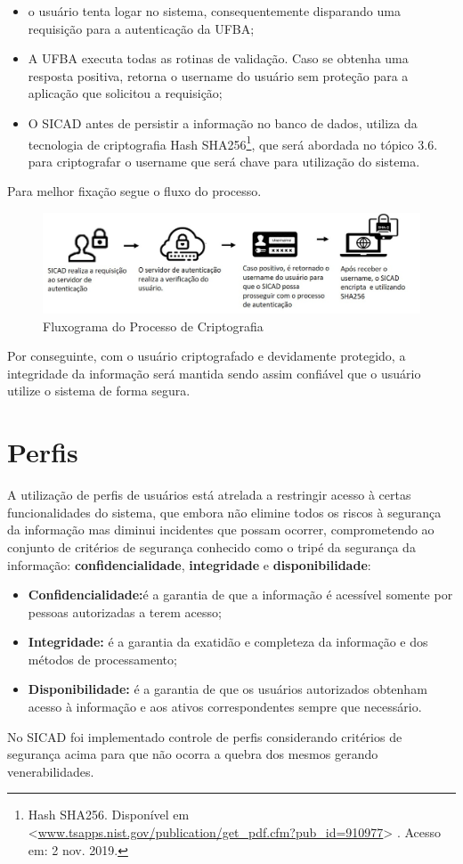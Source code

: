 \documentclass[12pt, a4paper]{report}
\begin{document}
\begin{itemize}
\item o usuário tenta logar no sistema, consequentemente disparando uma requisição para a autenticação da UFBA;
\item A UFBA executa todas as rotinas de validação.
Caso se obtenha uma resposta positiva, retorna o username do usuário sem proteção para a aplicação que solicitou a requisição;
\item O SICAD antes de persistir a informação no banco de dados, utiliza da tecnologia de criptografia Hash SHA256\footnote{Hash SHA256. Disponível em <\url{www.tsapps.nist.gov/publication/get_pdf.cfm?pub_id=910977}> . Acesso em: 2 nov. 2019.}, que será abordada no tópico 3.6. para criptografar o username que será chave para utilização do sistema. 
\end{itemize}
\par Para melhor fixação segue o fluxo do processo.
\begin{figure}[ht]
\centering
\includegraphics[scale=0.80]{fluxograma_criptografia.jpg}
\caption{Fluxograma do Processo de Criptografia}
\label{fig:processo_autenticacao}
\end{figure}
\par Por conseguinte, com o usuário criptografado e devidamente protegido, a integridade da informação será mantida sendo assim confiável que o usuário utilize o sistema de forma segura.

\section{ Perfis}
\par
A utilização de perfis de usuários está atrelada a restringir acesso à certas funcionalidades do sistema, que embora não elimine todos os riscos à segurança da informação mas diminui incidentes que possam ocorrer, comprometendo ao conjunto de critérios de segurança conhecido como o tripé da segurança da informação: \textbf{confidencialidade}, \textbf{integridade} e \textbf{disponibilidade}:
\begin{itemize}
\item \textbf{Confidencialidade:}é a garantia de que a informação é acessível somente por pessoas autorizadas a terem acesso; \cite{iso}
\item \textbf{Integridade:} é a garantia da exatidão e completeza  da  informação  e dos métodos de processamento; \cite{iso}
\item \textbf{Disponibilidade:} é a  garantia de que os usuários autorizados obtenham acesso à informação e aos ativos correspondentes sempre  que necessário. \cite{iso}
\end{itemize}
\par No SICAD foi implementado controle de perfis considerando critérios de segurança acima para que não ocorra a quebra dos mesmos gerando venerabilidades.
\end{document}
